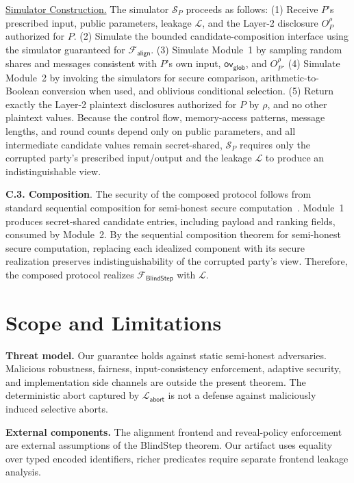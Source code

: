 \documentclass[conference,compsoc,letterpaper]{IEEEtran}
\theoremstyle{definition}
\theoremstyle{remark}
\newcommand{\myparagraph}[1]{\noindent \textbf{#1}.}
\newcommand{\myparagraphunderline}[1]{\noindent \underline{#1.}}
\newcommand{\BlindStep}{BlindStep\xspace}
\newcommand{\FBlindStep}{\mathcal{F}_{\textsf{BlindStep}}}
\newcommand{\Leak}{\mathcal{L}}
\newcommand{\LeakAbort}{\Leak_{\mathsf{abort}}}
\newcommand{\Sim}{\mathcal{S}}              %
\newcommand{\Falign}{\mathcal{F}_{\mathsf{align}}}
\newcommand{\policy}{\rho}
\newcommand{\globaloverflow}{\mathsf{ov}_{\mathsf{glob}}}
\begin{document}
\myparagraphunderline{Simulator Construction}
The simulator $\Sim_P$ proceeds as follows:
(1) Receive $P$'s prescribed input, public parameters, leakage $\Leak$, and the Layer-2 disclosure $O_P^\policy$ authorized for $P$.
(2) Simulate the bounded candidate-composition interface using the simulator guaranteed for $\Falign{}$.
(3) Simulate Module~1 by sampling random shares and messages consistent with $P$'s own input, $\globaloverflow$, and $O_P^\policy$.
(4) Simulate Module~2 by invoking the simulators for secure comparison, arithmetic-to-Boolean conversion when used, and oblivious conditional selection.
(5) Return exactly the Layer-2 plaintext disclosures authorized for $P$ by $\policy$, and no other plaintext values.
\noindent
Because the control flow, memory-access patterns, message lengths, and round counts depend only on public parameters, and all intermediate candidate values remain secret-shared, $\Sim_P$ requires only the corrupted party's prescribed input/output and the leakage $\Leak$ to produce an indistinguishable view.

\myparagraph{C.3. Composition}
The security of the composed protocol follows from standard sequential composition for semi-honest secure computation~\cite{oded2009foundations,lindell2017simulate}.
Module~1 produces secret-shared candidate entries, including payload and ranking fields, consumed by Module~2.
By the sequential composition theorem for semi-honest secure computation, replacing each idealized component with its secure realization preserves indistinguishability of the corrupted party's view.
Therefore, the composed protocol realizes $\FBlindStep$ with $\Leak$.

\section{Scope and Limitations}
\label{app:limitations}
\vspace{-2mm}

\noindent\textbf{Threat model.}
Our guarantee holds against static semi-honest adversaries.
Malicious robustness, fairness, input-consistency enforcement, adaptive security, and implementation side channels are outside the present theorem.
The deterministic abort captured by $\LeakAbort$ is not a defense against maliciously induced selective aborts.

\noindent\textbf{External components.}
The alignment frontend and reveal-policy enforcement are external assumptions of the \BlindStep{} theorem. Our artifact uses equality over typed encoded identifiers, richer predicates require separate frontend leakage analysis.
\end{document}
